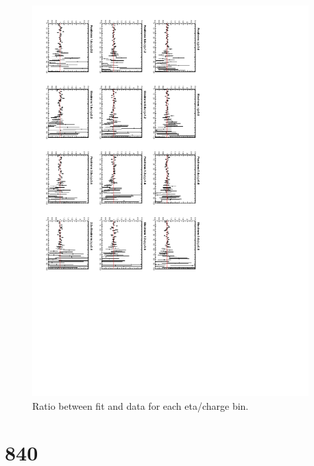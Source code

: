 \begin{figure}
\begin{center}
\includegraphics[trim = 0mm 0mm 80mm 100mm, clip, angle=90, width=0.95\textwidth]{Dec22_fitratio}
     \caption{\label{fig:fit2ratio}Ratio between fit and data for each eta/charge bin.}
  \end{center}
\end{figure}

\clearpage

\section{\unit{840}{\invpb}}

